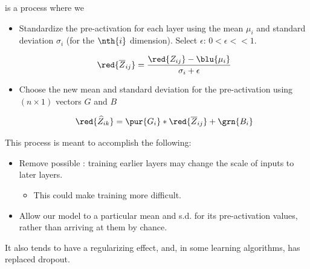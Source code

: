             \begin{definition}
                 is a process where we

                \begin{itemize}
                    \item Standardize the pre-activation for each layer using the mean $\mu_i$ and standard deviation $\sigma_i$ (for the $\nth{i}$ dimension). Select $\epsilon$: $0 < \epsilon<<1$.

                    \begin{equation*}
                        \red{ \overline{Z}_{ij} } =  \frac{ \red{Z_{ij}}  -\blu{\mu_i}}{\sigma_i+\epsilon}
                    \end{equation*}
                    
                    \item Choose the new mean and standard deviation for the pre-activation using $(n \times 1)$ vectors $G$ and $B$

                    \begin{equation*}
                        \red{\widehat{Z}_{ik}} = \pur{G_i} * \red{\overline{Z}_{ij}} + \grn{B_i}
                    \end{equation*}
                \end{itemize}

                \subsecdiv

                This process is meant to accomplish the following:

                \begin{itemize}
                    \item Remove possible : training earlier layers may change the scale of inputs to later layers.
                        \begin{itemize}
                            \item This could make training more difficult.
                        \end{itemize}
                    \item Allow our model to  a particular mean and s.d. for its pre-activation values, rather than arriving at them by chance.
                \end{itemize}

                It also tends to have a regularizing effect, and, in some learning algorithms, has replaced dropout.
            \end{definition}

